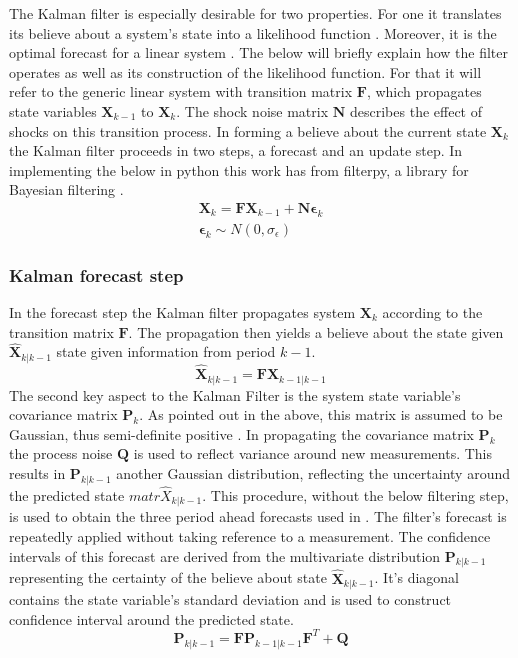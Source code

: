 \documentclass[12pt,a4paper,english]{article} %
\newcommand{\matr}[1]{\mathbf{#1}} %
\begin{document}
	The Kalman filter is especially desirable for two properties. For one it translates its believe about a system's state into a likelihood function \cite{kalman_new_1960}. Moreover, it is the optimal forecast for a linear system \cite{kalman_new_1960}. The below will briefly explain how the filter operates as well as its construction of the likelihood function. For that it will refer to the generic linear system with transition matrix $\matr{F}$, which propagates state variables $\matr{X}_{k-1}$ to $\matr{X}_k$. The shock noise matrix $\matr N$ describes the effect of shocks on this transition process. In forming a believe about the current state $\matr{X}_k$ the Kalman filter proceeds in two steps, a forecast and an update step. In implementing the below in python this work has from filterpy, a library for Bayesian filtering \cite{labbe_rlabbefilterpy_2023}.
	\begin{equation}
		\begin{aligned}
			\matr{X}_k = \matr F \matr{X}_{k-1} + \matr N \matr{\epsilon}_k \\
			\matr{\epsilon}_k \sim N(0, \sigma_{\epsilon})
		\end{aligned}
	\end{equation}
	
	\subsubsection{Kalman forecast step} \label{kalman_forecast_step}
	In the forecast step the Kalman filter propagates system $\matr X_{k}$ according to the transition matrix $\matr F$. The propagation then yields a believe about the state given $\matr{\hat{X}}_{k|k-1}$ state given information from period $k-1$.
	\[
		\matr{\hat{X}}_{k|k-1} = \matr F \matr X_{k-1|k-1}
	\]
	The second key aspect to the Kalman Filter is the system state variable's covariance matrix $\matr P_{k}$. As pointed out in the above, this matrix is assumed to be Gaussian, thus semi-definite positive \cite{andrews_kalman_2008}. In propagating the covariance matrix $\matr P_{k}$ the process noise $\matr Q$ is used to reflect variance around new measurements. This results in $\matr{P}_{k| k-1}$ another Gaussian distribution, reflecting the uncertainty around the predicted state $matr{\hat{X}}_{k|k-1}$.
	This procedure, without the below filtering step, is used to obtain the three period ahead forecasts used in . The filter's forecast is repeatedly applied without taking reference to a measurement. The confidence intervals of this forecast are derived from the multivariate distribution $\matr{P}_{k| k-1}$ representing the certainty of the believe about state $\matr{\hat{X}}_{k|k-1}$. It's diagonal contains the state variable's standard deviation and is used to construct confidence interval around the predicted state. 
	\[
		\matr{P}_{k| k-1} = \matr F \matr{P}_{k-1| k-1} \matr{F}^T + \matr Q
	\]
\end{document}
